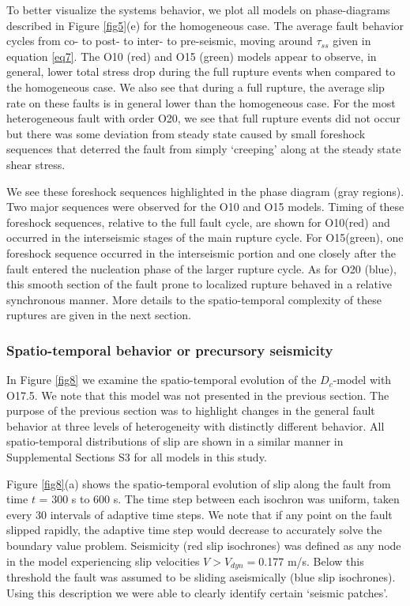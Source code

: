 \documentclass[preprint,1p, 10pt,authoryear]{elsarticle}
\begin{document}
To better visualize the systems behavior, we plot all models on phase-diagrams described in Figure \ref{fig5}(e) for the homogeneous case. The average fault behavior cycles from co- to post- to inter- to pre-seismic, moving around $\tau_{ss}$ given in equation \eqref{eq7}. The O10 (red) and O15 (green) models appear to observe, in general, lower total stress drop during the full rupture events when compared to the homogeneous case.  We also see that during a full rupture, the average slip rate on these faults is in general lower than the homogeneous case.  For the most heterogeneous fault with order O20, we see that full rupture events did not occur but there was some deviation from steady state caused by small foreshock sequences that deterred the fault from simply `creeping' along at the steady state shear stress. 

We see these foreshock sequences highlighted in the phase diagram (gray regions). Two major sequences were observed for the O10 and O15 models. Timing of these foreshock sequences, relative to the full fault cycle, are shown for O10(red) and occurred in the interseismic stages of the main rupture cycle. For O15(green), one foreshock sequence occurred in the interseismic portion and one closely after the fault entered the nucleation phase of the larger rupture cycle. As for O20 (blue), this smooth section of the fault prone to localized rupture behaved in a relative synchronous manner. More details to the spatio-temporal complexity of these ruptures are given in the next section. 

\subsubsection{Spatio-temporal behavior or precursory seismicity }
\label{spatialmodel}

In Figure \ref{fig8} we examine the spatio-temporal evolution of the $D_{c}$-model with O17.5. We note that this model was not presented in the previous section. The purpose of the previous section was to highlight changes in the general fault behavior at three levels of heterogeneity  with distinctly different behavior. All spatio-temporal distributions of slip are shown in a similar manner in Supplemental Sections S3 for all models in this study.

Figure \ref{fig8}(a) shows the spatio-temporal evolution of slip along the fault from time $t$ = 300 s to 600 s. The time step between each isochron was uniform, taken every 30 intervals of adaptive time steps.  We note that if any point on the fault slipped rapidly, the adaptive time step would decrease to accurately solve the boundary value problem. Seismicity (red slip isochrones) was defined as any node in the model experiencing slip velocities $V > V_{dyn}=$0.177 m/s. Below this threshold the fault was assumed to be sliding aseismically (blue slip isochrones). Using this description we were able to clearly identify certain `seismic patches'.
\end{document}
